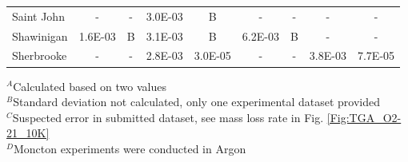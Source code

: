 \documentclass{book}
\begin{document}
\begin{table}[h!]
\begin{center}
\begin{tabular}{|l|cc|cc|cc|cc|}
Saint John              & -           & -               & 3.0E-03        & B                & -          & -                 & -           & -                     \\
Shawinigan              & 1.6E-03     & B               & 3.1E-03        & B                & 6.2E-03    & B                 & -           & -                     \\
Sherbrooke              & -           & -               & 2.8E-03        & 3.0E-05          & -          & -                 & 3.8E-03     & 7.7E-05               \\  \hline
\end{tabular}
\end{center}
$^A$Calculated based on two values \\
$^B$Standard deviation not calculated, only one experimental dataset provided \\
$^C$Suspected error in submitted dataset, see mass loss rate in Fig. \ref{Fig:TGA_O2-21_10K}\\
$^D$Moncton experiments were conducted in Argon
\end{table}
\end{document}
